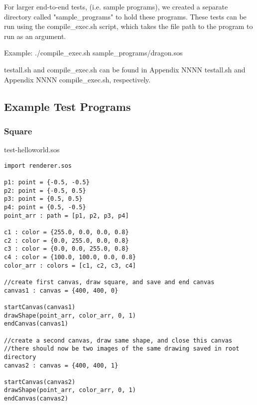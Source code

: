 \documentclass[main.tex]{subfiles}
\begin{document}
	For larger end-to-end tests, (i.e. sample programs), we created a separate directory called "sample\_programs" to hold these programs. These tests can be run using the compile\_exec.sh script, which takes the file path to the program to run as an argument.
	
	Example: ./compile\_exec.sh sample\_programs/dragon.sos
	
	testall.sh and compile\_exec.sh can be found in Appendix NNNN testall.sh and Appendix NNNN compile\_exec.sh, respectively. 
	
	\newpage
	\subsection{Example Test Programs}
	\subsubsection{Square}
	\colorbox{blue!30}{test-helloworld.sos}
	\begin{lstlisting}
import renderer.sos

p1: point = {-0.5, -0.5}
p2: point = {-0.5, 0.5}
p3: point = {0.5, 0.5}
p4: point = {0.5, -0.5}
point_arr : path = [p1, p2, p3, p4] 

c1 : color = {255.0, 0.0, 0.0, 0.8}
c2 : color = {0.0, 255.0, 0.0, 0.8}
c3 : color = {0.0, 0.0, 255.0, 0.8}
c4 : color = {100.0, 100.0, 0.0, 0.8}
color_arr : colors = [c1, c2, c3, c4] 

//create first canvas, draw square, and save and end canvas
canvas1 : canvas = {400, 400, 0}

startCanvas(canvas1)
drawShape(point_arr, color_arr, 0, 1)
endCanvas(canvas1)

//create a second canvas, draw same shape, and close this canvas
//there should now be two images of the same drawing saved in root directory
canvas2 : canvas = {400, 400, 1}

startCanvas(canvas2)
drawShape(point_arr, color_arr, 0, 1)
endCanvas(canvas2)
\end{lstlisting}
\end{document}
